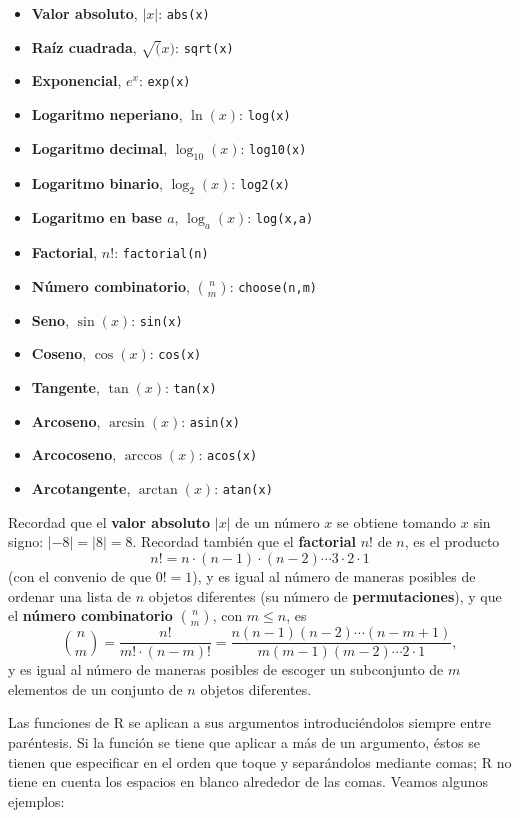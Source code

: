 \documentclass[]{book}
\theoremstyle{definition}
\theoremstyle{definition}
\theoremstyle{definition}
\theoremstyle{remark}
\begin{document}
\begin{itemize}
\item
  \textbf{Valor absoluto}, \(|x|\): \texttt{abs(x)}
\item
  \textbf{Raíz cuadrada}, \(\sqrt(x)\): \texttt{sqrt(x)}
\item
  \textbf{Exponencial}, \(e^x\): \texttt{exp(x)}
\item
  \textbf{Logaritmo neperiano}, \(\ln(x)\): \texttt{log(x)}
\item
  \textbf{Logaritmo decimal}, \(\log_{10}(x)\): \texttt{log10(x)}
\item
  \textbf{Logaritmo binario}, \(\log_2(x)\): \texttt{log2(x)}
\item
  \textbf{Logaritmo en base \(a\)}, \(\log_a(x)\): \texttt{log(x,a)}
\item
  \textbf{Factorial}, \(n!\): \texttt{factorial(n)}
\item
  \textbf{Número combinatorio}, \(\binom{n}{m}\): \texttt{choose(n,m)}
\item
  \textbf{Seno}, \(\sin(x)\): \texttt{sin(x)}
\item
  \textbf{Coseno}, \(\cos(x)\): \texttt{cos(x)}
\item
  \textbf{Tangente}, \(\tan(x)\): \texttt{tan(x)}
\item
  \textbf{Arcoseno}, \(\arcsin(x)\): \texttt{asin(x)}
\item
  \textbf{Arcocoseno}, \(\arccos(x)\): \texttt{acos(x)}
\item
  \textbf{Arcotangente}, \(\arctan(x)\): \texttt{atan(x)}
\end{itemize}

Recordad que el \textbf{valor absoluto} \(|x|\) de un número \(x\) se obtiene tomando \(x\) sin signo: \(|-8|=|8|=8\). Recordad también que el \textbf{factorial} \(n!\) de \(n\), es el producto
\[
n!=n\cdot (n-1)\cdot (n-2) \cdots 3\cdot 2 \cdot 1
\]
(con el convenio de que \(0!=1\)), y es igual al número de maneras posibles de ordenar una lista de \(n\) objetos diferentes (su número de \textbf{permutaciones}),
y que el \textbf{número combinatorio} \(\binom{n}{m}\), con \(m\leqslant n\), es
\[
\binom{n}{m}=\frac{n!}{m!\cdot (n-m)!}=\frac{n(n-1)(n-2)\cdots (n-m+1)}{m(m-1)(m-2)\cdots 2\cdot 1},
\]
y es igual al número de maneras posibles de escoger un subconjunto de \(m\) elementos de un conjunto de \(n\) objetos diferentes.

Las funciones de R se aplican a sus argumentos introduciéndolos siempre entre paréntesis. Si la función se tiene que aplicar a más de un argumento, éstos se tienen que especificar en el orden que toque y separándolos mediante comas; R no tiene en cuenta los espacios en blanco alrededor de las comas. Veamos algunos ejemplos:
\end{document}
